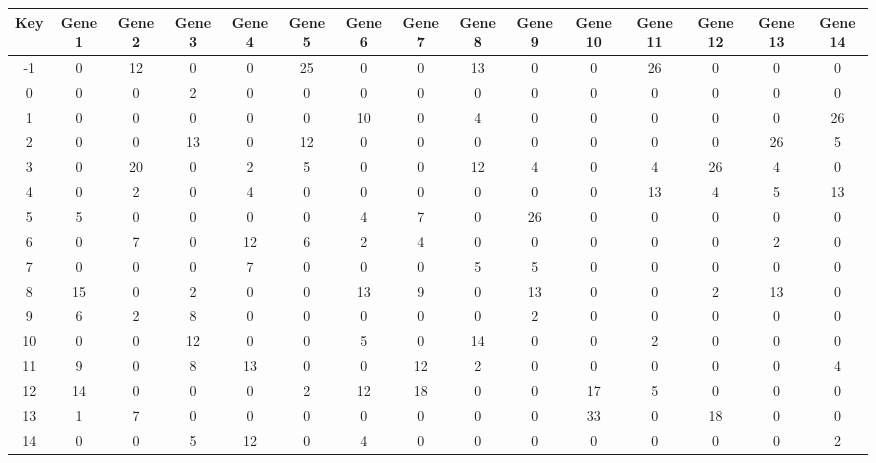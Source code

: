 \begin{tabular}{|c|c|c|c|c|c|c|c|c|c|c|c|c|c|c|}
\hline
Key & Gene 1 & Gene 2 & Gene 3 & Gene 4 & Gene 5 & Gene 6 & Gene 7 & Gene 8 & Gene 9 & Gene 10 & Gene 11 & Gene 12 & Gene 13 & Gene 14 \\
\hline
-1 & 0 & 12 & 0 & 0 & 25 & 0 & 0 & 13 & 0 & 0 & 26 & 0 & 0 & 0 \\
0 & 0 & 0 & 2 & 0 & 0 & 0 & 0 & 0 & 0 & 0 & 0 & 0 & 0 & 0 \\
1 & 0 & 0 & 0 & 0 & 0 & 10 & 0 & 4 & 0 & 0 & 0 & 0 & 0 & 26 \\
2 & 0 & 0 & 13 & 0 & 12 & 0 & 0 & 0 & 0 & 0 & 0 & 0 & 26 & 5 \\
3 & 0 & 20 & 0 & 2 & 5 & 0 & 0 & 12 & 4 & 0 & 4 & 26 & 4 & 0 \\
4 & 0 & 2 & 0 & 4 & 0 & 0 & 0 & 0 & 0 & 0 & 13 & 4 & 5 & 13 \\
5 & 5 & 0 & 0 & 0 & 0 & 4 & 7 & 0 & 26 & 0 & 0 & 0 & 0 & 0 \\
6 & 0 & 7 & 0 & 12 & 6 & 2 & 4 & 0 & 0 & 0 & 0 & 0 & 2 & 0 \\
7 & 0 & 0 & 0 & 7 & 0 & 0 & 0 & 5 & 5 & 0 & 0 & 0 & 0 & 0 \\
8 & 15 & 0 & 2 & 0 & 0 & 13 & 9 & 0 & 13 & 0 & 0 & 2 & 13 & 0 \\
9 & 6 & 2 & 8 & 0 & 0 & 0 & 0 & 0 & 2 & 0 & 0 & 0 & 0 & 0 \\
10 & 0 & 0 & 12 & 0 & 0 & 5 & 0 & 14 & 0 & 0 & 2 & 0 & 0 & 0 \\
11 & 9 & 0 & 8 & 13 & 0 & 0 & 12 & 2 & 0 & 0 & 0 & 0 & 0 & 4 \\
12 & 14 & 0 & 0 & 0 & 2 & 12 & 18 & 0 & 0 & 17 & 5 & 0 & 0 & 0 \\
13 & 1 & 7 & 0 & 0 & 0 & 0 & 0 & 0 & 0 & 33 & 0 & 18 & 0 & 0 \\
14 & 0 & 0 & 5 & 12 & 0 & 4 & 0 & 0 & 0 & 0 & 0 & 0 & 0 & 2 \\
\hline
\end{tabular}